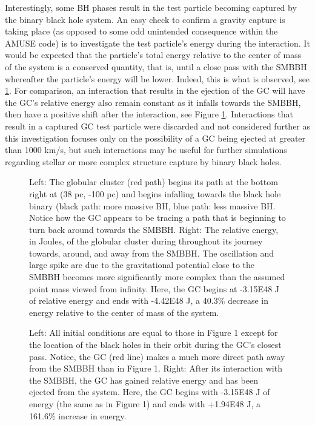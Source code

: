 \documentclass{aastex62}
\begin{document}
Interestingly, some BH phases result in the test particle becoming captured by the binary black hole system. An easy check to confirm a gravity capture is taking place (as opposed to some odd unintended consequence within the AMUSE code) is to investigate the test particle's energy during the interaction. It would be expected that the particle's total energy relative to the center of mass of the system is a conserved quantity, that is, until a close pass with the SMBBH whereafter the particle's energy will be lower. Indeed, this is what is observed, see \ref{fig3}. For comparison, an interaction that results in the ejection of the GC will have the GC's relative energy also remain constant as it infalls towards the SMBBH, then have a positive shift after the interaction, see Figure \ref{fig3}. Interactions that result in a captured GC test particle were discarded and not considered further as this investigation focuses only on the possibility of a GC being ejected at greater than 1000 km/s, but such interactions may be useful for further simulations regarding stellar or more complex structure capture by binary black holes.
\begin{figure}
\caption{Left: The globular cluster (red path) begins its path at the bottom right at (38 pc, -100 pc) and begins infalling towards the black hole binary (black path: more massive BH, blue path: less massive BH. Notice how the GC appears to be tracing a path that is beginning to turn back around towards the SMBBH. Right: The relative energy, in Joules, of the globular cluster during throughout its journey towards, around, and away from the SMBBH. The oscillation and large spike are due to the gravitational potential close to the SMBBH becomes more significantly more complex than the assumed point mass viewed from infinity. Here, the GC begins at -3.15E48 J of relative energy and ends with -4.42E48 J, a 40.3\% decrease in energy relative to the center of mass of the system.\label{fig3}}
\end{figure}
\begin{figure}
\caption{Left: All initial conditions are equal to those in Figure 1 except for the location of the black holes in their orbit during the GC's closest pass. Notice, the GC (red line) makes a much more direct path away from the SMBBH than in Figure 1. Right: After its interaction with the SMBBH, the GC has gained relative energy and has been ejected from the system. Here, the GC begins with -3.15E48 J of energy (the same as in Figure 1) and ends with +1.94E48 J, a 161.6\% increase in energy.\label{fig4}}
\end{figure}
\end{document}
